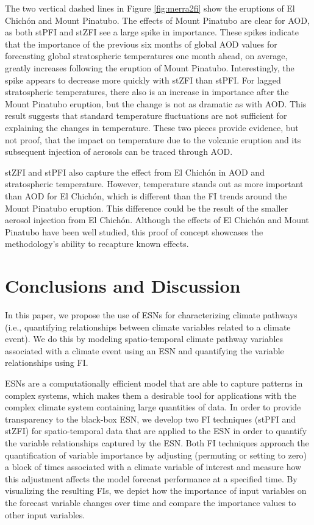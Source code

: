 \documentclass[AMS,STIX2COL]{WileyNJD-v2}
\begin{document}
The two vertical dashed lines in Figure \ref{fig:merra2fi} show the eruptions of El Chichón and Mount Pinatubo. The effects of Mount Pinatubo are clear for AOD, as both stPFI and stZFI see a large spike in importance. These spikes indicate that the importance of the previous six months of global AOD values for forecasting global stratospheric temperatures one month ahead, on average, greatly increases following the eruption of Mount Pinatubo. Interestingly, the spike appears to decrease more quickly with stZFI than stPFI. For lagged stratospheric temperatures, there also is an increase in importance after the Mount Pinatubo eruption, but the change is not as dramatic as with AOD. This result suggests that standard temperature fluctuations are not sufficient for explaining the changes in temperature. These two pieces provide evidence, but not proof, that the impact on temperature due to the volcanic eruption and its subsequent injection of aerosols can be traced through AOD.

stZFI and stPFI also capture the effect from El Chichón in AOD and stratospheric temperature. However, temperature stands out as more important than AOD for El Chichón, which is different than the FI trends around the Mount Pinatubo eruption. This difference could be the result of the smaller aerosol injection from El Chichón. Although the effects of El Chichón and Mount Pinatubo have been well studied, this proof of concept showcases the methodology's ability to recapture known effects.

\section{Conclusions and Discussion} \label{sec:conclusion}

In this paper, we propose the use of ESNs for characterizing climate pathways (i.e., quantifying relationships between climate variables related to a climate event). We do this by modeling spatio-temporal climate pathway variables associated with a climate event using an ESN and quantifying the variable relationships using FI.

ESNs are a computationally efficient model that are able to capture patterns in complex systems, which makes them a desirable tool for applications with the complex climate system containing large quantities of data. In order to provide transparency to the black-box ESN, we develop two FI techniques (stPFI and stZFI) for spatio-temporal data that are applied to the ESN in order to quantify the variable relationships captured by the ESN. Both FI techniques approach the quantification of variable importance by adjusting (permuting or setting to zero) a block of times associated with a climate variable of interest and measure how this adjustment affects the model forecast performance at a specified time. By visualizing the resulting FIs, we depict how the importance of input variables on the forecast variable changes over time and compare the importance values to other input variables.
\end{document}
